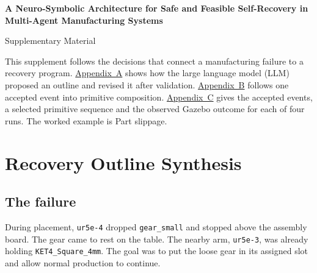 \documentclass[preprint,12pt,authoryear]{elsarticle}
\let\code\nolinkurl
\newcommand{\papertitle}{A Neuro-Symbolic Architecture for Safe and Feasible Self-Recovery in Multi-Agent Manufacturing Systems}
\begin{document}
\pagestyle{plain}
\begin{center}
  {\Large\bfseries \papertitle\par}
  \medskip
  {\large Supplementary Material\par}
\end{center}

This supplement follows the decisions that connect a manufacturing failure to a recovery
program. \hyperref[sec:outline-prompt]{Appendix~A} shows how the large language model (LLM) proposed an outline and
revised it after validation. \hyperref[sec:composition-prompt]{Appendix~B} follows one accepted event into primitive
composition. \hyperref[sec:gazebo]{Appendix~C} gives the accepted events, a selected primitive sequence and
the observed Gazebo outcome for each of four runs. The worked example is Part slippage.

\appendix
\section{Recovery Outline Synthesis}
\subsection{The failure}\label{sec:failure}

During placement, \code{ur5e-4} dropped \code{gear_small} and stopped above the
assembly board. The gear came to rest on the table. The nearby arm, \code{ur5e-3},
was already holding \code{KET4_Square_4mm}. The goal was to put the loose gear in
its assigned slot and allow normal production to continue.
\end{document}
